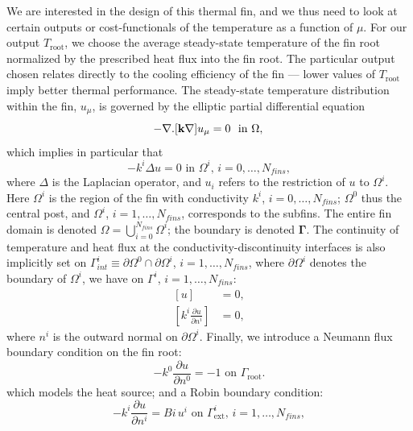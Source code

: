 \documentclass[graybox]{svmult}
\begin{document}
We are interested in the design of this thermal fin, and we thus need to look at certain outputs or cost-functionals of the temperature as a function of $\mu$. For our output $T_{\text{root}}$, we choose the average steady-state temperature of the fin root normalized by the prescribed heat flux into the fin root. The particular output chosen relates directly to the cooling efficiency of the fin --- lower values of $T_{\text{root}}$ imply better thermal performance. The steady-state temperature distribution within the fin, $u_\mu$, is governed by the elliptic partial differential equation
\begin{equation}
\label{eq:testcase-strong-Omega}
- \nabla . [{\bf k}\nabla] u_\mu = 0 \  \text{ in } \Omega, \, 
\end{equation}
which implies in particular that
\begin{equation}
\label{eq:testcase-strong}
-k^i\Delta u = 0 \text{ in } \Omega^i, \, i = 0, \ldots, N_{fins},
\end{equation}
where $\Delta$ is the Laplacian operator, and $u_i$ refers to the restriction of $u$ to $\Omega^i$. Here $\Omega^i$ is the region of the fin with conductivity $k^i$, $i = 0, \ldots, N_{fins}$; $\Omega^0$ thus the central post, and $\Omega^i$, $i = 1, \ldots, N_{fins}$, corresponds to the subfins. The entire fin domain is denoted $\Omega = \bigcup_{i=0}^{N_{fins}} \Omega^i$; the boundary is denoted $\mathbf{\Gamma}$. The continuity of temperature and heat flux at the conductivity-discontinuity interfaces is also implicitly set on $\Gamma_{int}^i \equiv \partial\Omega^0 \cap \partial\Omega^i$, $i = 1, \ldots, N_{fins}$, where $\partial\Omega^i$ denotes the boundary of $\Omega^i$, we have on $\Gamma^i$, $i = 1, \ldots, N_{fins}$:
\begin{equation}
\label{eq:interface-conditions}
\begin{aligned}
[u] &= 0, \\
\left[k^i \frac{\partial u}{\partial n^i}\right] &= 0,
\end{aligned}
\end{equation}
where $n^i$ is the outward normal on $\partial\Omega^i$. Finally, we introduce a Neumann flux boundary condition on the fin root:
\begin{equation}
\label{eq:flux-bc}
-k^0 \frac{\partial u}{\partial n^0} = -1 \text{ on } \Gamma_{\text{root}}. 
\end{equation}
which models the heat source; and a Robin boundary condition:
\begin{equation}
\label{eq:robin-bc}
-k^i \frac{\partial u}{\partial n^i} = Bi\,u^i  \text{ on } \Gamma^i_{\text{ext}}, \, i = 1, \ldots, N_{fins},
\end{equation}
\end{document}
